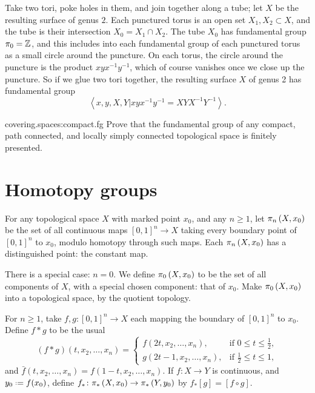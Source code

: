 
\begin{example}
Take two tori, poke holes in them, and join together along a tube; let \(X\) be the resulting surface of genus \(2\).
Each punctured torus is an open set \(X_1, X_2 \subset X\), and the tube is their intersection \(X_0=X_1 \cap X_2\).
The tube \(X_0\) has fundamental group \(\pi_0=\mathbb{Z}^{}\), and this includes into each fundamental group of each punctured torus as a small circle around the puncture.
On each torus, the circle around the puncture is the product \(xyx^{-1}y^{-1}\), which of course vanishes once we close up the puncture.
So if we glue two tori together, the resulting surface \(X\) of genus 2 has fundamental group 
\[
\left<x,y,X,Y|xyx^{-1}y^{-1}=XYX^{-1}Y^{-1}\right>.
\]
\end{example}
\begin{problem}{covering.spaces:compact.fg}
Prove that the fundamental group of any compact, path connected, and locally simply connected topological space is finitely presented.
\end{problem}


\section{Homotopy groups}
For any topological space \(X\) with marked point \(x_0\), and any \(n\ge 1\), let \(\pi_{n}\left(X,x_0\right)\) be the set of all continuous maps \([0,1]^n \to X\) taking every boundary point of \([0,1]^n\) to \(x_0\), modulo homotopy through such maps.
Each \(\pi_{n}\left(X,x_0\right)\) has a distinguished point: the constant map.

There is a special case: \(n=0\).
We define \(\pi_{0}\left(X,x_0\right)\) to be the set of all components of \(X\), with a special chosen component: that of \(x_0\).
Make \(\pi_{0}\left(X,x_0\right)\) into a topological space, by the quotient topology.

For \(n\ge 1\), take \(f,g \colon [0,1]^n \to X\) each mapping the boundary of \([0,1]^n\) to \(x_0\).
Define \(f*g\) to be the usual 
\[
(f*g)(t,x_2,\dots,x_n) =
\begin{cases}
f(2t,x_2,\dots,x_n), & \text{if \(0 \le t\le \frac{1}{2}\)}, \\
g(2t-1,x_2,\dots,x_n), & \text{if \(\frac{1}{2} \le t\le 1\)},
\end{cases}
\]
and \(\bar{f}(t,x_2,\dots,x_n)=f(1-t,x_2,\dots,x_n)\).
If \(f \colon X \to Y\) is continuous, and \(y_0\defeq f(x_0)\), define \(f_* \colon \pi_{*}\left(X,x_0\right) \to \pi_{*}\left(Y,y_0\right)\) by \(f_*[g] = [f \circ g]\).

